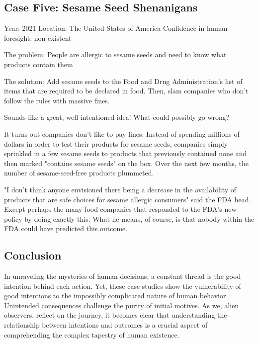\documentclass{article}
\begin{document}
\subsection{Case Five: Sesame Seed Shenanigans}

Year: 2021
Location: The United States of America
Confidence in human foresight: non-existent


The problem: People are allergic to sesame seeds and need to know what products
contain them

The solution: Add sesame seeds to the Food and Drug Administration's list of
items that are required to be declared in food. Then, slam companies who don't
follow the rules with massive fines.

Sounds like a great, well intentioned idea! What could possibly go wrong?

It turns out companies don't like to pay fines. Instead of spending millions of
dollars in order to test their products for sesame seeds, companies simply
sprinkled in a few sesame seeds to products that previously contained none and
then marked "contains sesame seeds" on the box. Over the next few months, the
number of sesame-seed-free products plummeted.

"I don't think anyone envisioned there being a decrease in the availability of
products that are safe choices for sesame allergic consumers" said the FDA
head. Except perhaps the many food companies that responded to the FDA's new
policy by doing exactly this. What he means, of course, is that nobody within
the FDA could have predicted this outcome.

\subsection{Conclusion}

In unraveling the mysteries of human decisions, a constant thread is the good
intention behind each action. Yet, these case studies show the vulnerability of
good intentions to the impossibly complicated nature of human behavior.
Unintended consequences challenge the purity of initial motives. As we, alien
observers, reflect on the journey, it becomes clear that understanding the
relationship between intentions and outcomes is a crucial aspect of
comprehending the complex tapestry of human existence.

\newpage

\printbibliography
\end{document}
